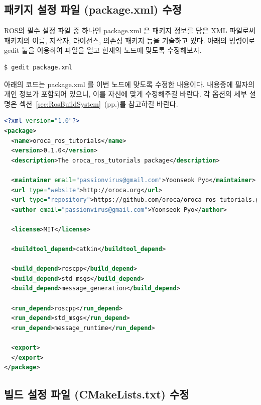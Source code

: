 \subsection{패키지 설정 파일 (package.xml) 수정}

ROS의 필수 설정 파일 중 하나인 package.xml 은 패키지 정보를 담은 XML 파일로써 패키지의 이름, 저작자, 라이선스, 의존성 패키지 등을 기술하고 있다. 아래의 명령어로 gedit 툴을 이용하여 파일을 열고 현재의 노드에 맞도록 수정해보자.

\begin{lstlisting}[language=bash]
$ gedit package.xml 
\end{lstlisting}

아래의 코드는 package.xml 를 이번 노드에 맞도록 수정한 내용이다. 내용중에 필자의 개인 정보가 포함되어 있으니, 이를 자신에 맞게 수정해주길 바란다. 각 옵션의 세부 설명은 섹션~\ref{sec:RosBuildSystem}~(pp.\pageref{sec:RosBuildSystem})를 참고하길 바란다.

\begin{lstlisting}[language=XML]
<?xml version="1.0"?>
<package>
  <name>oroca_ros_tutorials</name>
  <version>0.1.0</version>
  <description>The oroca_ros_tutorials package</description>

  <maintainer email="passionvirus@gmail.com">Yoonseok Pyo</maintainer>
  <url type="website">http://oroca.org</url>
  <url type="repository">https://github.com/oroca/oroca_ros_tutorials.git</url>
  <author email="passionvirus@gmail.com">Yoonseok Pyo</author>

  <license>MIT</license>

  <buildtool_depend>catkin</buildtool_depend>

  <build_depend>roscpp</build_depend>
  <build_depend>std_msgs</build_depend>
  <build_depend>message_generation</build_depend>

  <run_depend>roscpp</run_depend>
  <run_depend>std_msgs</run_depend>
  <run_depend>message_runtime</run_depend>

  <export>
  </export>
</package>
\end{lstlisting}

\subsection{빌드 설정 파일 (CMakeLists.txt) 수정}

